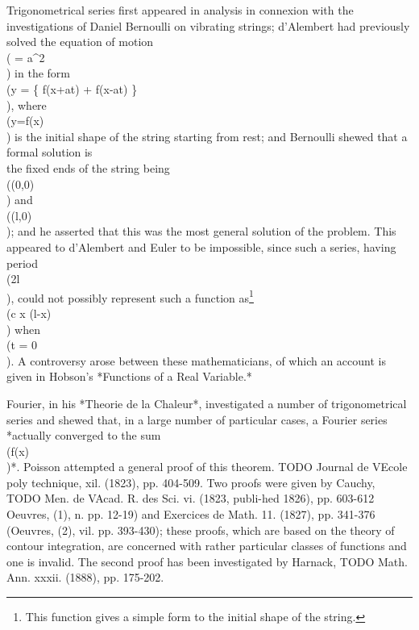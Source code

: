 Trigonometrical series first appeared in analysis in connexion with
the investigations of Daniel Bernoulli on vibrating
strings;
d'Alembert had previously solved the equation of
motion
\\(  = a^{2} \\)
in the form
\\(y =  \left\{ f(x+at) + f(x-at) \right\}\\), where \\(y=f(x)\\) is
the initial shape of the string starting from rest;
and Bernoulli shewed that a formal solution is
\\[ 
y
=
\sum_{n=1}^{\infty}
b_{n}
\sin \frac{n \pi x}{l}
\cos \frac{n \pi a t}{l},
\\] 
the fixed ends of the string being \\((0,0)\\) and \\((l,0)\\); and he asserted
that this was the most general solution of the problem. This appeared
to d'Alembert and Euler to be impossible, since such a series, having
period \\(2l\\), could not possibly represent such a function
as\footnote{This function gives a simple form to the initial shape of the string.}
\\(c x (l-x)\\) when \\(t = 0\\).
A controversy arose between these mathematicians, of which
an account is given in Hobson's *Functions of a Real Variable.*

Fourier, in his *Theorie de la Chaleur*, investigated a number of
trigonometrical series and shewed that, in a large number of
particular cases, a Fourier series *actually converged to the sum \\(f(x)\\)*.
Poisson attempted a general proof of this theorem. TODO Journal de VEcole
poly technique, xil. (1823), pp. 404-509. Two proofs were given by
Cauchy, TODO Men. de VAcad. R. des Sci. vi. (1823, publi-hed 1826), pp.
603-612 Oeuvres, (1), n. pp. 12-19) and Exercices de Math. 11. (1827),
pp. 341-376 (Oeuvres, (2), vil. pp. 393-430); these proofs, which are
based on the theory of contour integration, are concerned with rather
particular classes of functions and one is invalid. The second proof
has been investigated by Harnack, TODO Math. Ann. xxxii. (1888), pp.
175-202.

